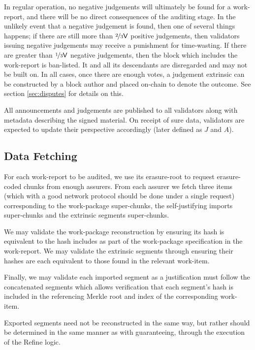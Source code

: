 In regular operation, no negative judgements will ultimately be found for a work-report, and there will be no direct consequences of the auditing stage. In the unlikely event that a negative judgement is found, then one of several things happens; if there are still more than $\nicefrac{2}{3}\mathsf{V}$ positive judgements, then validators issuing negative judgements may receive a punishment for time-wasting. If there are greater than $\nicefrac{1}{3}\mathsf{V}$ negative judgements, then the block which includes the work-report is ban-listed. It and all its descendants are disregarded and may not be built on. In all cases, once there are enough votes, a judgement extrinsic can be constructed by a block author and placed on-chain to denote the outcome. See section \ref{sec:disputes} for details on this.

All announcements and judgements are published to all validators along with metadata describing the signed material. On receipt of sure data, validators are expected to update their perspective accordingly (later defined as $J$ and $A$).

\subsection{Data Fetching}

For each work-report to be audited, we use its erasure-root to request erasure-coded chunks from enough assurers. From each assurer we fetch three items (which with a good network protocol should be done under a single request) corresponding to the work-package super-chunks, the self-justifying imports super-chunks and the extrinsic segments super-chunks.

We may validate the work-package reconstruction by ensuring its hash is equivalent to the hash includes as part of the work-package specification in the work-report. We may validate the extrinsic segments through ensuring their hashes are each equivalent to those found in the relevant work-item.

Finally, we may validate each imported segment as a justification must follow the concatenated segments which allows verification that each segment's hash is included in the referencing Merkle root and index of the corresponding work-item.

Exported segments need not be reconstructed in the same way, but rather should be determined in the same manner as with guaranteeing, \ie through the execution of the Refine logic.

